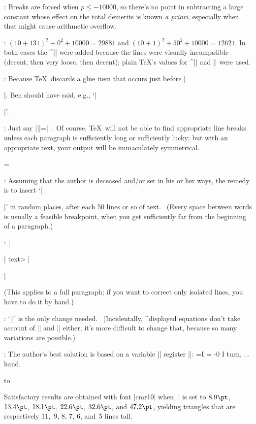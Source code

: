 {{:
 Breaks are forced when $p\le-10000$, so there's no point in
subtracting a large constant whose effect on the total demerits is
known {\sl a priori}, especially when that might cause arithmetic overflow.

:
 $(10+131)^2+0^2+10000=29881$ and $(10+1)^2+50^2+10000=12621$.
In both cases the ^|\adjdemerits| were added because the lines were
visually incompatible (decent, then very loose, then decent); plain
\TeX's values for ^|\linepenalty| and |\adjdemerits| were used.

:
 Because \TeX\ discards a glue item that occurs just before
|\par|. Ben should have said, e.g., `|\hfilneg\ \par|'.

:
 Just say |\parfillskip|\stretch|=|\stretch|\parindent|. Of course,
\TeX\ will not be able to find appropriate line breaks unless each
paragraph is sufficiently long or sufficiently lucky; but with an
appropriate text, your output will be immaculately
symmetrical.{\parfillskip=\parindent\par}

:
 Assuming that the author is deceased and/or set in his or her
ways, the remedy is to insert `|{\parfillskip=0pt\par\parskip=0pt\noindent}|'
in random places, after each 50 lines or so of text. \ (Every space
between words is usually a feasible breakpoint, when you get sufficiently
far from the beginning of a paragraph.)

:
 |{\leftskip=-1pt \rightskip=1pt| \<text> |\par}|\par
\nobreak\medskip\noindent
(This applies to a full paragraph; if you want to correct only
isolated lines, you have to do it by hand.)

:
 `|\def\line#1{\hbox to\hsize{\hskip\leftskip#1\hskip\rightskip}}|'
is the only change needed. \ (Incidentally,
^{displayed equations} don't take account of\/ |\leftskip| and |\rightskip|
either; it's more difficult to change that, because so many variations
are possible.)

:
 The author's best solution is based on a variable |\dimen|
register |\x|:
\begintt
{}=\hbox{I}
=\vbox{ -0\x
  \ifdim \x>2em \rightskip=-\wd1
  \else \frenchspacing \rightskip=-\wd1 plus1pt minus1pt
   \leftskip=0pt plus 1pt minus1pt \fi
  \parfillskip=0pt  \noindent I turn, ... hand.}
\centerline{\hbox to }
\endtt
Satisfactory results are obtained with font |cmr10| when |\x| is set to
$8.9\pt$, $13.4\pt$, $18.1\pt$, $22.6\pt$, $32.6\pt$, and $47.2\pt$,
yielding triangles that are respectively 11,~9, 8, 7, 6, and~5 lines tall.

}}
